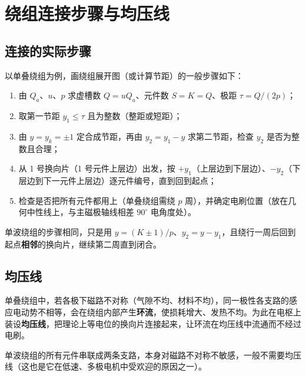 \section{绕组连接步骤与均压线}

\subsection{连接的实际步骤}
以单叠绕组为例，画绕组展开图（或计算节距）的一般步骤如下：
\begin{enumerate}
  \item 由 $Q_a$、$u$、$p$ 求虚槽数 $Q=uQ_a$、元件数 $S=K=Q$、极距 $\tau=Q/(2p)$；
  \item 取第一节距 $y_1\le\tau$ 且为整数（整距或短距）；
  \item 由 $y=y_k=\pm1$ 定合成节距，再由 $y_2=y_1-y$ 求第二节距，检查 $y_2$ 是否为整数且合理；
  \item 从 1 号换向片（1 号元件上层边）出发，按 $+y_1$（上层边到下层边）、$-y_2$（下层边到下一元件上层边）逐元件编号，直到回到起点；
  \item 检查是否把所有元件都用上（单叠绕组需绕 $p$ 周），并确定电刷位置（放在几何中性线上，与主磁极轴线相差 $90^\circ$ 电角度处）。
\end{enumerate}
单波绕组的步骤相同，只是用 $y=(K\pm1)/p$、$y_2=y-y_1$，且绕行一周后回到起点\textbf{相邻}的换向片，继续第二周直到闭合。

\subsection{均压线}
单叠绕组中，若各极下磁路不对称（气隙不均、材料不均），同一极性各支路的感应电动势不相等，会在绕组内部产生\textbf{环流}，使损耗增大、发热不均。为此在电枢上装设\textbf{均压线}，把理论上等电位的换向片连接起来，让环流在均压线中流通而不经过电刷。

单波绕组的所有元件串联成两条支路，本身对磁路不对称不敏感，一般不需要均压线（这也是它在低速、多极电机中受欢迎的原因之一）。

